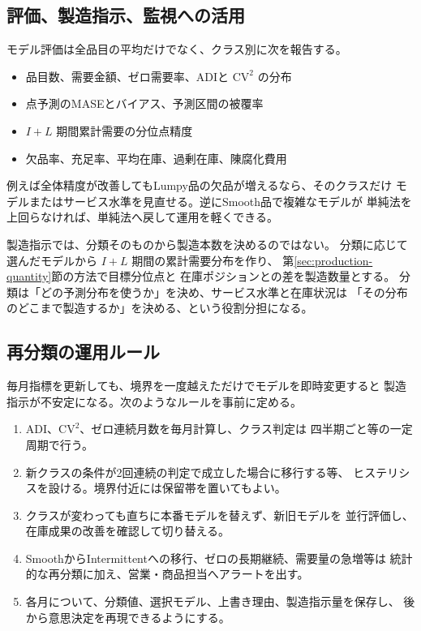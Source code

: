 \documentclass[a4paper,11pt]{jsarticle}
\begin{document}
\subsection{評価、製造指示、監視への活用}

モデル評価は全品目の平均だけでなく、クラス別に次を報告する。
\begin{itemize}
\item 品目数、需要金額、ゼロ需要率、ADIと $\mathrm{CV}^2$ の分布
\item 点予測のMASEとバイアス、予測区間の被覆率
\item $I+L$ 期間累計需要の分位点精度
\item 欠品率、充足率、平均在庫、過剰在庫、陳腐化費用
\end{itemize}
例えば全体精度が改善してもLumpy品の欠品が増えるなら、そのクラスだけ
モデルまたはサービス水準を見直せる。逆にSmooth品で複雑なモデルが
単純法を上回らなければ、単純法へ戻して運用を軽くできる。

製造指示では、分類そのものから製造本数を決めるのではない。
分類に応じて選んだモデルから $I+L$ 期間の累計需要分布を作り、
第\ref{sec:production-quantity}節の方法で目標分位点と
在庫ポジションとの差を製造数量とする。
分類は「どの予測分布を使うか」を決め、サービス水準と在庫状況は
「その分布のどこまで製造するか」を決める、という役割分担になる。

\subsection{再分類の運用ルール}

毎月指標を更新しても、境界を一度越えただけでモデルを即時変更すると
製造指示が不安定になる。次のようなルールを事前に定める。
\begin{enumerate}
\item ADI、$\mathrm{CV}^2$、ゼロ連続月数を毎月計算し、クラス判定は
四半期ごと等の一定周期で行う。
\item 新クラスの条件が2回連続の判定で成立した場合に移行する等、
ヒステリシスを設ける。境界付近には保留帯を置いてもよい。
\item クラスが変わっても直ちに本番モデルを替えず、新旧モデルを
並行評価し、在庫成果の改善を確認して切り替える。
\item SmoothからIntermittentへの移行、ゼロの長期継続、需要量の急増等は
統計的な再分類に加え、営業・商品担当へアラートを出す。
\item 各月について、分類値、選択モデル、上書き理由、製造指示量を保存し、
後から意思決定を再現できるようにする。
\end{enumerate}
\end{document}
